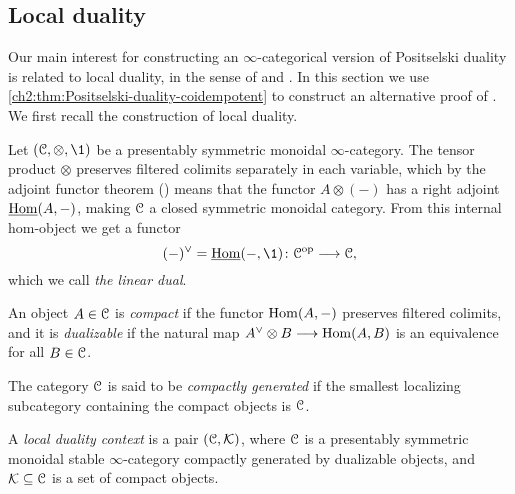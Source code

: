 

\subsection{Local duality}
\label{ch2:ssec:local-duality}

Our main interest for constructing an $\infty$-categorical version of Positselski duality is related to local duality, in the sense of \cite{hovey-palmiery-strickland_97} and \cite{barthel-heard-valenzuela_2018}. In this section we use \cref{ch2:thm:Positselski-duality-coidempotent} to construct an alternative proof of \cite[2.21]{barthel-heard-valenzuela_2018}. We first recall the construction of local duality.

Let $(\C, \otimes, \1)$ be a presentably symmetric monoidal $\infty$-category. The tensor product $\otimes$ preserves filtered colimits separately in each variable, which by the adjoint functor theorem (\cite[5.5.2.9]{lurie_09}) means that the functor $A\otimes (-)$ has a right adjoint $\operatorname{\underline{Hom}}(A, -)$, making $\EuScript{C}$ a closed symmetric monoidal category. From this internal hom-object we get a functor 
\[(-)^\vee = \iHom(-, \1)\: \C\op \to \C,\] 
which we call \emph{the linear dual}. 

\begin{definition}
    An object $A\in \EuScript{C}$ is \emph{compact} if the functor $\operatorname{Hom}(A, -)$ preserves filtered colimits, and it is \emph{dualizable} if the natural map $A^\vee \otimes B \longrightarrow \operatorname{Hom}(A,B)$ is an equivalence for all $B\in \EuScript{C}$. 
\end{definition}

The category $\EuScript{C}$ is said to be \emph{compactly generated} if the smallest localizing subcategory containing the compact objects is $\EuScript{C}$. 

\begin{definition}
    A \emph{local duality context} is a pair $(\EuScript{C}, \mathcal{K})$, where $\EuScript{C}$ is a presentably symmetric monoidal stable $\infty$-category compactly generated by dualizable objects, and $\mathcal{K}\subseteq \EuScript{C}$ is a set of compact objects. 
\end{definition}

